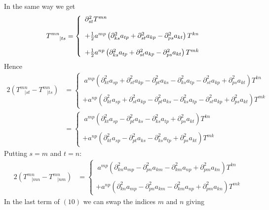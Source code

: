 In the same way we get
\begin{align}
T^{mn}_{\ \ \ \ |ts} &= \left\{\begin{array}{l}\partial^2_{st}T^{mn}\\\\ +\frac{1}{2} a^{mp} \left( \partial^2_{ks} a_{tp} + \partial^2_{st} a_{kp} - \partial^2_{ps} a_{kt} \right) T^{kn}  \\\\  + \frac{1}{2}   a^{np} \left( \partial^2_{ks} a_{tp} + \partial^2_{st} a_{kp} - \partial^2_{ps} a_{kt}\right)T^{mk} \end{array}\right.
\end{align}
Hence 
\begin{align}
2\left(T^{mn}_{\ \ \ \ |st}-T^{mn}_{\ \ \ \ |ts}\right) &= \left\{\begin{array}{l} \ a^{mp} \left( \partial^2_{kt} a_{sp} + \partial^2_{st} a_{kp} - \partial^2_{pt} a_{ks} - \partial^2_{ks} a_{tp} - \partial^2_{st} a_{kp} + \partial^2_{ps} a_{kt}  \right) T^{kn}  \\\\  + a^{np} \left( \partial^2_{kt} a_{sp} + \partial^2_{st} a_{kp} - \partial^2_{pt} a_{ks}- \partial^2_{ks} a_{tp} - \partial^2_{st} a_{kp} + \partial^2_{ps} a_{kt}\right)T^{mk} \end{array}\right.\\
&= \left\{\begin{array}{l} \ a^{mp} \left( \partial^2_{kt} a_{sp} - \partial^2_{pt} a_{ks} - \partial^2_{ks} a_{tp} + \partial^2_{ps} a_{kt}  \right) T^{kn}  \\\\  + a^{np} \left( \partial^2_{kt} a_{sp}  - \partial^2_{pt} a_{ks}- \partial^2_{ks} a_{tp} + \partial^2_{ps} a_{kt}\right)T^{mk} \end{array}\right.
\end{align}
Putting $s=m$ and $t=n$:
\begin{align}
2\left(T^{mn}_{\ \ \ \ |mn}-T^{mn}_{\ \ \ \ |nm}\right) 
&= \left\{\begin{array}{l} \ a^{mp} \left( \partial^2_{kn} a_{mp} - \partial^2_{pn} a_{km} - \partial^2_{km} a_{np} + \partial^2_{pm} a_{kn}  \right) T^{kn}  \\\\  + a^{np} \left( \partial^2_{kn} a_{mp}  - \partial^2_{pn} a_{km}- \partial^2_{km} a_{np} + \partial^2_{pm} a_{kn}\right)T^{mk} \end{array}\right.
\end{align}
In the last term of $(10)$ we can swap the indices $m$ and $n$ giving
